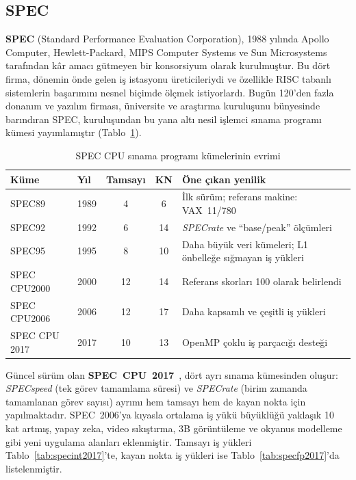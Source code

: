 \subsection{SPEC}
\label{subsec:spec}

\textbf{SPEC} (Standard Performance Evaluation Corporation), 1988 yılında Apollo Computer, Hewlett-Packard, MIPS Computer Systems ve Sun Microsystems tarafından kâr amacı gütmeyen bir konsorsiyum olarak kurulmuştur. Bu dört firma, dönemin önde gelen iş istasyonu üreticileriydi ve özellikle RISC tabanlı sistemlerin başarımını nesnel biçimde ölçmek istiyorlardı. Bugün 120'den fazla donanım ve yazılım firması, üniversite ve araştırma kuruluşunu bünyesinde barındıran SPEC, kuruluşundan bu yana altı nesil işlemci sınama programı kümesi yayımlamıştır (Tablo~\ref{tab:spec-nesiller}).

\begin{table}[H]
\centering
\caption{SPEC CPU sınama programı kümelerinin evrimi}
\label{tab:spec-nesiller}
\small
\begin{tabular}{@{}llccp{7.5cm}@{}}
\toprule
\textbf{Küme} & \textbf{Yıl} & \textbf{Tamsayı} & \textbf{KN} & \textbf{Öne çıkan yenilik} \\
\midrule
SPEC89       & 1989 &  4 &  6 & İlk sürüm; referans makine: VAX~11/780 \\
SPEC92       & 1992 &  6 & 14 & \emph{SPECrate} ve ``base/peak'' ölçümleri \\
SPEC95       & 1995 &  8 & 10 & Daha büyük veri kümeleri; L1 önbelleğe sığmayan iş yükleri \\
SPEC CPU2000 & 2000 & 12 & 14 & Referans skorları 100 olarak belirlendi \\
SPEC CPU2006 & 2006 & 12 & 17 & Daha kapsamlı ve çeşitli iş yükleri \\
SPEC CPU 2017 & 2017 & 10 & 13 & OpenMP\index{OpenMP} çoklu iş parçacığı desteği \\
\bottomrule
\end{tabular}
\end{table}

Güncel sürüm olan \textbf{SPEC~CPU~2017}~\cite{bucek2018}, dört ayrı sınama kümesinden oluşur: \emph{SPECspeed} (tek görev tamamlama süresi) ve \emph{SPECrate} (birim zamanda tamamlanan görev sayısı) ayrımı hem tamsayı hem de kayan nokta için yapılmaktadır. SPEC~2006'ya kıyasla ortalama iş yükü büyüklüğü yaklaşık 10 kat artmış, yapay zeka, video sıkıştırma, 3B görüntüleme ve okyanus modelleme gibi yeni uygulama alanları eklenmiştir. Tamsayı iş yükleri Tablo~\ref{tab:specint2017}'te, kayan nokta iş yükleri ise Tablo~\ref{tab:specfp2017}'da listelenmiştir.

